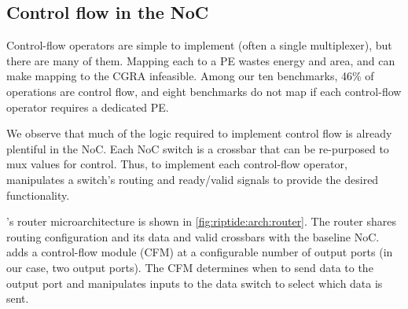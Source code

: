 \subsection{Control flow in the NoC}
\label{riptide:fin}

Control-flow operators are simple to implement (often a single
multiplexer), but there are many of them.
%
Mapping each to a PE wastes energy and area, and can make mapping
to the CGRA infeasible.
%
Among our ten benchmarks,
46\% of operations are control flow,
and eight benchmarks do not map if each control-flow operator requires a dedicated PE.

We observe that much of the logic required to implement control flow is already
plentiful in the NoC.
%
Each NoC switch is a crossbar that can be re-purposed to mux values for
control.
%
Thus, to implement each control-flow operator, \riptide manipulates a switch's
routing and ready/valid signals to provide the desired functionality.

\riptide's router microarchitecture is shown in \autoref{fig:riptide:arch:router}.
% 
The router shares routing configuration and its data and valid crossbars with
the baseline NoC.
%
\riptide adds a control-flow module (CFM) at a configurable number of output ports (in our case, two output ports).
% 
The CFM determines when to send data to the output port and
manipulates inputs to the data switch to select which data is sent.



